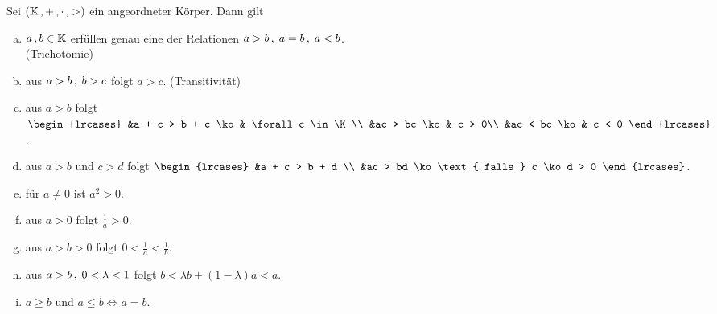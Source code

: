 \documentclass[../ana1.tex]{subfiles}
\begin{document}
\begin{satz}\label{satz:arechenregeln}
	Sei \((\mathbb{K} \operatorname{,} + \operatorname{,} \cdot \operatorname{,} >)\) ein angeordneter Körper. Dann gilt
	\begin{enumerate}[(a)]
		\item \(a \operatorname{,} b \in \mathbb{K}\) erfüllen genau eine der Relationen \(a > b \operatorname{,} \; a = b \operatorname{,} \; a < b\).\\
			  (Trichotomie)
		\item aus \(a > b \operatorname{,} \; b > c\) folgt \(a > c\). (Transitivität)
		\item aus \(a > b\) folgt
		      \(\begin{lrcases}
					&a + c > b + c \ko & \forall c \in \K\\
				    &ac > bc \ko 	   & c > 0\\
				    &ac < bc \ko 	   & c < 0
			    \end{lrcases}\).
		\item aus \(a > b\) und \(c>d\) folgt
		      \(\begin{lrcases}
				      &a + c > b + d \\
					  &ac > bd \ko \text{ falls } c \ko d > 0
			      \end{lrcases}\).
		\item für \(a\neq 0\) ist \(a^{2} > 0\).
		\item aus \(a > 0\) folgt \(\frac{1}{a} > 0\).
		\item aus \(a > b > 0\) folgt \(0 < \frac{1}{a} < \frac{1}{b}\).
		\item aus \(a > b \operatorname{,} \; 0 < \lambda < 1\) folgt \(b < \lambda b + (1 - \lambda)a < a\).
		\item \(a \geq b\) und \(a \leq b \iff a = b\).
	\end{enumerate}
\end{satz}
\end{document}
